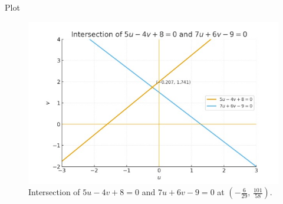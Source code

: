 \documentclass{beamer}
\theoremstyle{remark}
\begin{document}
\begin{frame}{Plot}
  \begin{figure}[H]
  \centering
  \includegraphics[width=0.8\linewidth]{figs/matgeo-5.2.2.jpeg}
  \caption{Intersection of $5u-4v+8=0$ and $7u+6v-9=0$ at
           $\left(-\tfrac{6}{29},\,\tfrac{101}{58}\right)$.}
  \label{fig:5.2.2}
\end{figure}
\end{frame}
\end{document}
